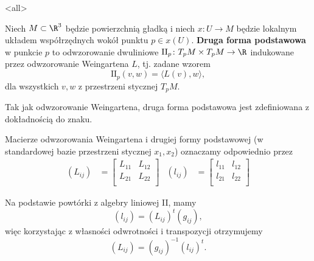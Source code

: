 \mode<all>{}
\begin{frame}[<+->]



\begin{definicja}
Niech $M\subset \R^3$ będzie powierzchnią gładką i niech $x\colon U\to M$ będzie lokalnym układem współrzędnych wokół punktu $p\in x(U)$. \textbf{Druga forma podstawowa} w punkcie $p$ to odwzorowanie dwuliniowe $\text{II}_p\colon T_pM\times T_pM\to \R$ indukowane przez odwzorowanie Weingartena $L$, tj. zadane wzorem
\[\text{II}_p(v,w)=\langle L(v),w\rangle,\]
dla wszystkich $v,w$ z przestrzeni stycznej $T_pM$.
\end{definicja}
\begin{uwaga}
Tak jak odwzorowanie Weingartena, druga forma podstawowa jest zdefiniowana z dokładnością do znaku.
\end{uwaga}

\end{frame}
\begin{frame}[<+->]

\begin{uwaga}[Oznaczenie]
Macierze odwzorowania Weingartena i drugiej formy podstawowej (w standardowej bazie przestrzeni stycznej $x_1,x_2$) oznaczamy odpowiednio  przez 
\begin{align*}
(L_{ij})&=\left[
\begin{array}{cc}
L_{11}&L_{12}\\
L_{21}&L_{22}\\
\end{array}
\right]& (l_{ij})&=\left[
\begin{array}{cc}
l_{11}&l_{12}\\
l_{21}&l_{22}\\
\end{array}
\right]
\end{align*}
\end{uwaga}

\begin{wniosek}
Na podstawie powtórki z algebry liniowej II, mamy \[(l_{ij})=(L_{ij})^t(g_{ij}),\]więc korzystając z własności odwrotności i transpozycji otrzymujemy
\[(L_{ij})=(g_{ij})^{-1}(l_{ij})^t.\]
\end{wniosek}
\end{frame}
